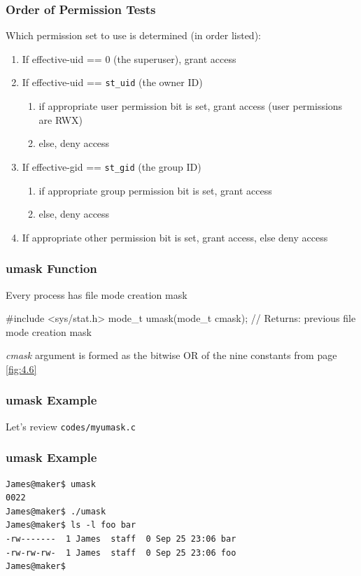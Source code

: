\documentclass[newPxFont,sthlmFooter,nooffset]{beamer}
\begin{document}
\begin{frame}
  \frametitle{Order of Permission Tests}
Which permission set to use is determined (in order listed):
\begin{enumerate}
\item If effective-uid == 0 (the superuser), grant access
\item If effective-uid == \texttt{st\_uid} (the owner ID)
   \begin{enumerate}
   \item if appropriate user permission bit is set, grant access (user
     permissions are RWX)
   \item else, deny access
   \end{enumerate}
\item If effective-gid == \texttt{st\_gid} (the group ID)
   \begin{enumerate}
   \item if appropriate group permission bit is set, grant access
   \item else, deny access
   \end{enumerate}
\item If appropriate other permission bit is set, grant access, else deny access
\end{enumerate}
\end{frame}



\begin{frame}[containsverbatim,t]
  \frametitle{umask Function}
Every process has file mode creation mask

\begin{codedef}
#include <sys/stat.h> 
mode_t umask(mode_t cmask);
// Returns: previous file mode creation mask  
\end{codedef}

\textit{cmask} argument is formed as the bitwise OR of the nine constants from page \ref{fig:4.6}
\end{frame}


\begin{frame}[containsverbatim,t]
  \frametitle{umask Example}
Let's review \texttt{codes/myumask.c}

\end{frame}


\begin{frame}[containsverbatim,t]
  \frametitle{umask Example}
{\footnotesize
\begin{verbatim}
James@maker$ umask
0022
James@maker$ ./umask
James@maker$ ls -l foo bar
-rw-------  1 James  staff  0 Sep 25 23:06 bar
-rw-rw-rw-  1 James  staff  0 Sep 25 23:06 foo
James@maker$
\end{verbatim}
}
\end{frame}
\end{document}
